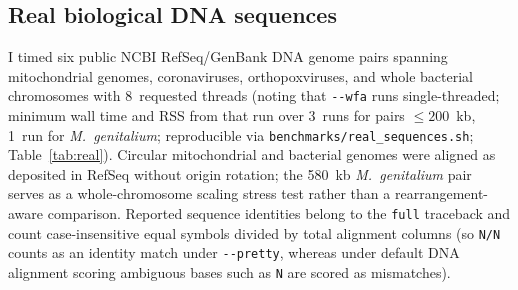 \documentclass[11pt,a4paper]{article}
\begin{document}
\subsection{Real biological DNA sequences}

I timed six public NCBI RefSeq/GenBank DNA genome pairs spanning mitochondrial genomes, coronaviruses, orthopoxviruses, and whole bacterial chromosomes with 8~requested threads (noting that \texttt{-{}-wfa} runs single-threaded; minimum wall time and RSS from that run over 3~runs for pairs $\le 200$~kb, 1~run for \textit{M.~genitalium}; reproducible via \texttt{benchmarks/real\_sequences.sh}; Table~\ref{tab:real}). Circular mitochondrial and bacterial genomes were aligned as deposited in RefSeq without origin rotation; the 580~kb \textit{M.~genitalium} pair serves as a whole-chromosome scaling stress test rather than a rearrangement-aware comparison. Reported sequence identities belong to the \texttt{full} traceback and count case-insensitive equal symbols divided by total alignment columns (so \texttt{N/N} counts as an identity match under \texttt{-{}-pretty}, whereas under default DNA alignment scoring ambiguous bases such as \texttt{N} are scored as mismatches).
\end{document}
